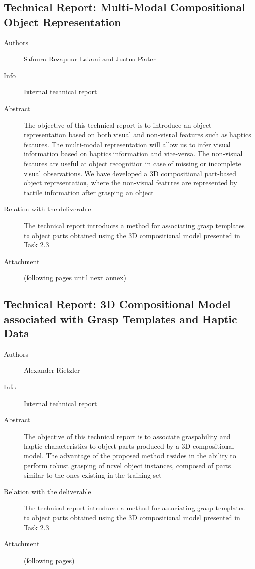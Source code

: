 \documentclass[a4paper,11pt,pdf]{pacmanreport}
\begin{document}
\subsection{Technical Report: Multi-Modal Compositional Object Representation} \label{ann:techReport}
\begin{description}
\item[Authors] Safoura Rezapour Lakani and Justus Piater
\item[Info] Internal technical report
\item[Abstract] The objective of this technical report is to introduce an 
object representation based on both visual and non-visual features such as 
haptics features. The multi-modal representation will allow us to infer visual 
information based on haptics information and vice-versa. The non-visual features 
are useful at object recognition in case of missing or incomplete visual 
observations. We have developed a 3D compositional part-based object 
representation, where the non-visual features are represented by tactile 
information after grasping an object

\item[Relation with the deliverable] The technical report introduces a method for associating grasp templates to 
object parts obtained using the 3D compositional model presented in Task 2.3
\item[Attachment] (following pages until next annex)
\end{description}


\subsection{Technical Report: 3D Compositional Model associated with Grasp Templates and Haptic Data} \label{ann:techReportAlex}
\begin{description}
\item[Authors] Alexander Rietzler
\item[Info] Internal technical report
\item[Abstract] The objective of this technical report is to associate 
graspability and haptic characteristics to object parts produced by a 3D 
compositional model. The advantage of the proposed method resides in the ability 
to perform robust grasping of novel object instances, composed of parts similar 
to the ones existing in the training set
\item[Relation with the deliverable] The technical report introduces a method for associating grasp templates to object parts obtained using the 3D compositional model presented in Task 2.3
\item[Attachment] (following pages)
\end{description}

\end{document}
